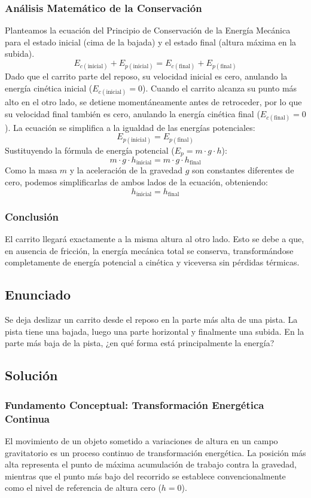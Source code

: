 \documentclass[12pt,a4paper]{article}
\begin{document}
\subsubsection*{Análisis Matemático de la Conservación}
Planteamos la ecuación del Principio de Conservación de la Energía Mecánica para el estado inicial (cima de la bajada) y el estado final (altura máxima en la subida).
$$E_{c(\text{inicial})} + E_{p(\text{inicial})} = E_{c(\text{final})} + E_{p(\text{final})}$$
Dado que el carrito parte del reposo, su velocidad inicial es cero, anulando la energía cinética inicial ($E_{c(\text{inicial})} = 0$). Cuando el carrito alcanza su punto más alto en el otro lado, se detiene momentáneamente antes de retroceder, por lo que su velocidad final también es cero, anulando la energía cinética final ($E_{c(\text{final})} = 0$).
La ecuación se simplifica a la igualdad de las energías potenciales:
$$E_{p(\text{inicial})} = E_{p(\text{final})}$$
Sustituyendo la fórmula de energía potencial ($E_p = m \cdot g \cdot h$):
$$m \cdot g \cdot h_{\text{inicial}} = m \cdot g \cdot h_{\text{final}}$$
Como la masa $m$ y la aceleración de la gravedad $g$ son constantes diferentes de cero, podemos simplificarlas de ambos lados de la ecuación, obteniendo:
$$h_{\text{inicial}} = h_{\text{final}}$$

\subsubsection*{Conclusión}
El carrito llegará exactamente a la misma altura al otro lado. Esto se debe a que, en ausencia de fricción, la energía mecánica total se conserva, transformándose completamente de energía potencial a cinética y viceversa sin pérdidas térmicas.

\newpage
\subsection*{Enunciado}
Se deja deslizar un carrito desde el reposo en la parte más alta de una pista. La pista tiene una bajada, luego una parte horizontal y finalmente una subida. En la parte más baja de la pista, ¿en qué forma está principalmente la energía?

\subsection*{Solución}

\subsubsection*{Fundamento Conceptual: Transformación Energética Continua}
El movimiento de un objeto sometido a variaciones de altura en un campo gravitatorio es un proceso continuo de transformación energética. La posición más alta representa el punto de máxima acumulación de trabajo contra la gravedad, mientras que el punto más bajo del recorrido se establece convencionalmente como el nivel de referencia de altura cero ($h = 0$).
\end{document}
